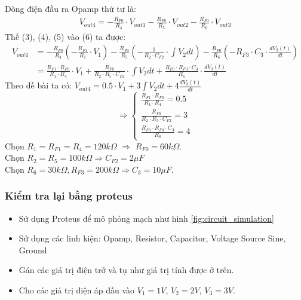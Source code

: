 				\hspace*{0.6cm}Dòng điện đầu ra Opamp thứ tư là:
				\begin{align}
					V_{out4} = -\frac{R_{F0}}{R_4} \cdot V_{out1} - \frac{R_{F0}}{R_5} \cdot V_{out2} - \frac{R_{F0}}{R_6} \cdot V_{out3}
				\end{align}
				\hspace*{0.6cm}Thế (3), (4), (5) vào (6) ta được:
				\begin{align*}
					V_{out4} &= -\frac{R_{F0}}{R_4}\left(-\frac{R_{F1}}{R_1} \cdot V_1\right) - \frac{R_{F0}}{R_5}\left(-\frac{1}{R_2 \cdot C_{F2}} \cdot \int V_{2} dt\right) - \frac{R_{F0}}{R_6}\left(-R_{F3} \cdot C_{3} \cdot \frac{dV_{3}(t)}{dt}\right)\\
						 &= \frac{R_{F1} \cdot R_{F0}}{R_1 \cdot R_4} \cdot V_1 + \frac{R_{F0}}{R_2 \cdot R_5 \cdot C_{F2}} \cdot \int V_{2} dt + \frac{R_{F0} \cdot R_{F3} \cdot C_{3}}{R_6} \cdot \frac{dV_{3}(t)}{dt}
				\end{align*}
				\newpage
				Theo đề bài ta có: $V_{out4} = 0.5 \cdot V_1 + 3 \int V_{2} dt + 4 \frac{dV_{3}(t)}{dt}$ 
				\[
				\Rightarrow
				\begin{cases}
					\frac{R_{F1} \cdot R_{F0}}{R_1 \cdot R_4} = 0.5\\
					\frac{R_{F0}}{R_2 \cdot R_5 \cdot C_{F2}} = 3\\
					\frac{R_{F0} \cdot R_{F3} \cdot C_{3}}{R_6} = 4
				\end{cases}
				\]
				\hspace*{0.6cm}Chọn $R_{1} = R_{F1} = R_{4} = 120k\Omega$ $\Rightarrow$ $R_{F0} = 60k\Omega$.\\
				\hspace*{0.6cm}Chọn $R_{2} = R_{5} = 100k\Omega \Rightarrow C_{F2} = 2\mu F$\\
				\hspace*{0.6cm}Chọn $R_{6} = 30k\Omega, R_{F3} = 200k\Omega \Rightarrow C_{3} = 10\mu F$.\\
			\subsubsection{Kiểm tra lại bằng proteus}
				\begin{itemize}
					\item Sử dụng Proteus để mô phỏng mạch như hình \ref{fig:circuit_simulation}
					\item Sử dụng các linh kiện: Opamp, Resistor, Capacitor, Voltage Source Sine, Ground
					\item Gán các giá trị điện trở và tụ như giá trị tính được ở trên.
					\item Cho các giá trị điện áp đầu vào $V_1 = 1V$, $V_2 = 2V$, $V_3 = 3V$.
				
				\end{itemize}